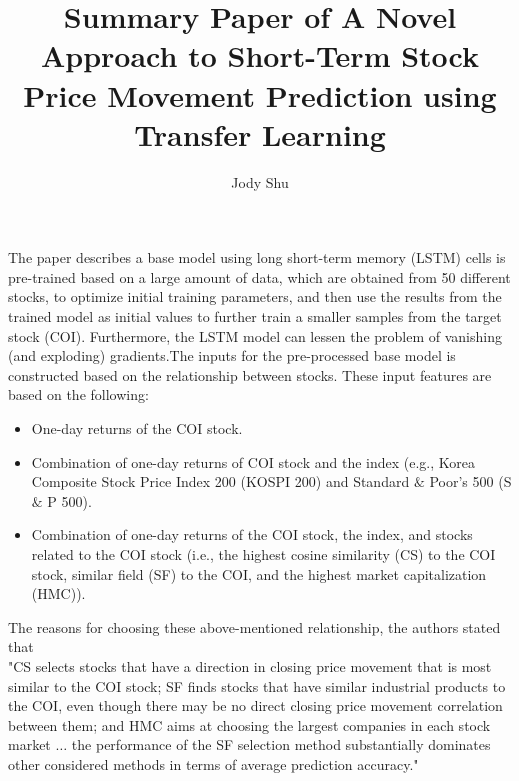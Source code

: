 \documentclass[11pt, oneside]{article}
\title{Summary Paper of A Novel Approach to Short-Term Stock Price Movement Prediction using Transfer Learning}
\author{Jody Shu}
\begin{document}
\maketitle
\begin{Large}
The paper describes a base model using long short-term memory (LSTM) cells is pre-trained based on a large amount of data, which are obtained from 50 different stocks, to optimize initial training parameters, and then use the results from the trained model as initial values to further train a smaller samples from the target stock (COI).  Furthermore,  the LSTM model can lessen the problem of vanishing (and exploding) gradients.The inputs for the pre-processed base model is constructed based on the relationship between stocks. These input features are based on the following:\\

\begin{itemize}
\item One-day returns of the COI stock. 
\item Combination of one-day returns of COI stock and the index (e.g.,
Korea Composite Stock Price Index 200 (KOSPI 200) and Standard $\&$ Poor's 500 (S $\&$ P 500). 
\item Combination of one-day returns of the COI stock, the index, and stocks related to the COI stock (i.e., the highest cosine similarity (CS) to the COI stock, similar field (SF) to the COI, and the highest
market capitalization (HMC)).
\end{itemize}

The reasons for choosing these above-mentioned relationship, the authors stated that \\
"CS selects stocks that have a direction in closing price movement that is most similar to the COI stock; SF finds stocks that have similar industrial products to the COI, even though there may be no direct closing price movement correlation between them; and HMC aims at choosing the largest companies in each stock market $\ldots$ the performance of the SF selection method substantially dominates other considered methods in terms of average prediction accuracy."\\



\end{Large}
\end{document}
